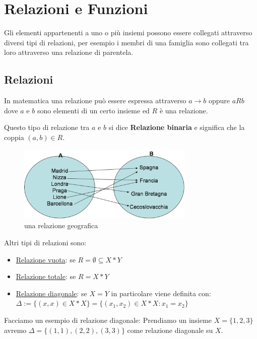 \documentclass{article}
\theoremstyle{definition}
\begin{document}
\newpage
\section{Relazioni e Funzioni}
Gli elementi appartenenti a uno o più insiemi possono essere collegati attraverso diversi tipi di relazioni, per esempio i membri di una famiglia sono collegati tra loro attraverso una relazione di parentela. \par


\subsection{Relazioni}
In matematica una relazione può essere espressa attraverso $ a \to b$ oppure $ a R b $ dove $ a $ e $ b $ sono elementi di un certo insieme ed $ R $ è una relazione. \par
Questo tipo di relazione tra $ a $ e $ b $ si dice \textbf{Relazione binaria} e significa che la coppia $ (a,b) \in R $. \par

\begin{figure}[h]
        \centering
                \includegraphics[width=0.75\textwidth]{relazioni.png}
        \caption{una relazione geografica}\label{fig:esempio_relazione}
\end{figure}

Altri tipi di relazioni sono:
\begin{itemize}
        \item \underline{Relazione vuota}: se $ R = \emptyset \subseteq X*Y $ 
        \item \underline{Relazione totale}: se $ R = X*Y $ 
        \item \underline{Relazione diagonale}: se $ X=Y $ in particolare viene definita con: \newline $ \Delta := \{(x,x) \in X*X\} = \{(x_1,x_2) \in X*X : x_1 = x_2\} $  
\end{itemize}
Facciamo un esempio di relazione diagonale: \newline
Prendiamo un insieme $ X = \{1,2,3\} $ avremo $ \Delta = \{(1,1), (2,2),(3,3)\} $ come relazione diagonale su $ X $.
\end{document}
